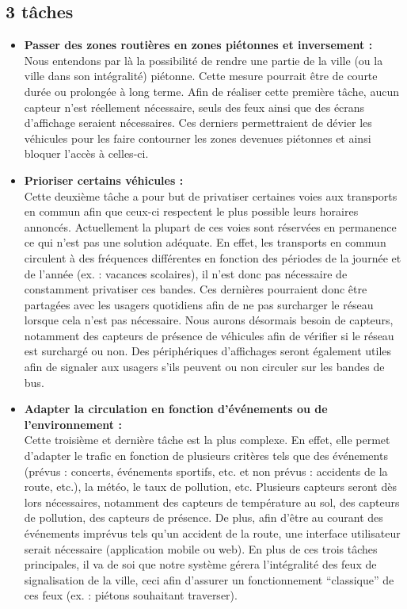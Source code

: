 \subsection{3 tâches}
\begin{itemize}
    \item \textbf{Passer des zones routières en zones piétonnes et inversement :}\\
    Nous entendons par là la possibilité de rendre une partie de la ville (ou la ville dans son intégralité) piétonne. Cette mesure pourrait être de courte durée ou prolongée à long terme. Afin de réaliser cette première tâche, aucun capteur n’est réellement nécessaire, seuls des feux ainsi que des écrans d’affichage seraient nécessaires. Ces derniers permettraient de dévier les véhicules pour les faire contourner les zones devenues piétonnes et ainsi bloquer l’accès à celles-ci.
    \item \textbf{Prioriser certains véhicules :}\\
    Cette deuxième tâche a pour but de privatiser certaines voies aux transports en commun afin que ceux-ci respectent le plus possible leurs horaires annoncés. Actuellement la plupart de ces voies sont réservées en permanence ce qui n’est pas une solution adéquate. En effet, les transports en commun circulent à des fréquences différentes en fonction des périodes de la journée et de l’année (ex. : vacances scolaires), il n’est donc pas nécessaire de constamment privatiser ces bandes. Ces dernières pourraient donc être partagées avec les usagers quotidiens afin de ne pas surcharger le réseau lorsque cela n’est pas nécessaire. Nous aurons désormais besoin de capteurs, notamment des capteurs de présence de véhicules afin de vérifier si le réseau est surchargé ou non. Des périphériques d’affichages seront également utiles afin de signaler aux usagers s’ils peuvent ou non circuler sur les bandes de bus.
    \item \textbf{Adapter la circulation en fonction d'événements ou de l’environnement :}\\
    Cette troisième et dernière tâche est la plus complexe. En effet, elle permet d’adapter le trafic en fonction de plusieurs critères tels que des événements (prévus : concerts, événements sportifs, etc. et non prévus : accidents de la route, etc.), la météo, le taux de pollution, etc. Plusieurs capteurs seront dès lors nécessaires, notamment des capteurs de température au sol, des capteurs de pollution, des capteurs de présence. De plus, afin d’être au courant des événements imprévus tels qu’un accident de la route, une interface utilisateur serait nécessaire (application mobile ou web). En plus de ces trois tâches principales, il va de soi que notre système gérera l’intégralité des feux de signalisation de la ville, ceci afin d’assurer un fonctionnement “classique” de ces feux (ex. : piétons souhaitant traverser).
\end{itemize}